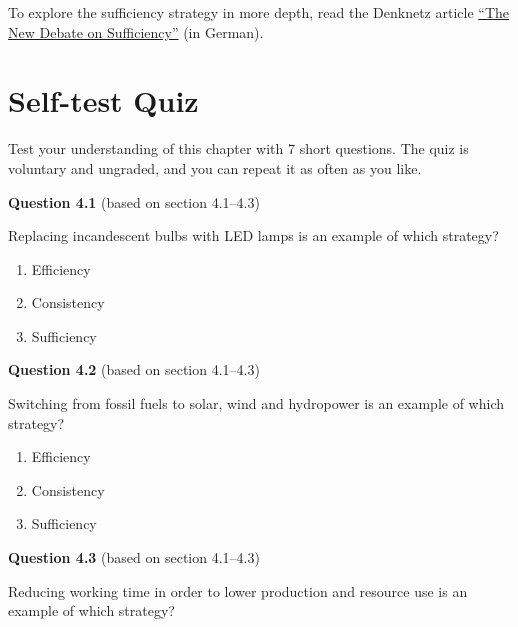 \documentclass[
  british,
  a4paper,
  DIV=11,
  numbers=noendperiod,
  oneside,
  openany]{scrreprt}
\providecommand{\tightlist}{%
  \setlength{\itemsep}{0pt}\setlength{\parskip}{0pt}}
\begin{document}
\begin{tcolorbox}[enhanced jigsaw, arc=.35mm, bottomrule=.15mm, bottomtitle=1mm, breakable, colback=white, colbacktitle=quarto-callout-note-color!10!white, colframe=quarto-callout-note-color-frame, coltitle=black, left=2mm, leftrule=.75mm, opacityback=0, opacitybacktitle=0.6, rightrule=.15mm, title={Further reading}, titlerule=0mm, toprule=.15mm, toptitle=1mm]

To explore the sufficiency strategy in more depth, read the Denknetz
article \href{https://ilias.unibe.ch/go/file/3803485}{``The New Debate
on Sufficiency''} (in German).

\end{tcolorbox}

\section*{Self-test Quiz}\label{self-test-quiz-3}


Test your understanding of this chapter with 7 short questions. The quiz
is voluntary and ungraded, and you can repeat it as often as you like.

\textbf{Question 4.1} (based on section 4.1--4.3)

Replacing incandescent bulbs with LED lamps is an example of which
strategy?

\begin{enumerate}
\def\labelenumi{\alph{enumi})}
\tightlist
\item
  Efficiency
\item
  Consistency
\item
  Sufficiency
\end{enumerate}

\textbf{Question 4.2} (based on section 4.1--4.3)

Switching from fossil fuels to solar, wind and hydropower is an example
of which strategy?

\begin{enumerate}
\def\labelenumi{\alph{enumi})}
\tightlist
\item
  Efficiency
\item
  Consistency
\item
  Sufficiency
\end{enumerate}

\textbf{Question 4.3} (based on section 4.1--4.3)

Reducing working time in order to lower production and resource use is
an example of which strategy?
\end{document}
